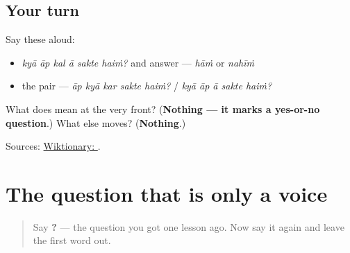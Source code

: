 \subsection*{Your turn}
Say these aloud:

\begin{itemize}
\raggedright
  \item \emph{kyā āp kal ā sakte haiṁ?} and answer — \emph{hāṁ} or \emph{nahīṁ}
  \item the pair — \emph{āp kyā kar sakte haiṁ?} / \emph{kyā āp ā sakte haiṁ?}
\end{itemize}

\begin{tcolorbox}[breakable,colback=teal!4,colframe=teal!35!black,title={Before you move on}]
What does \textbf{} mean at the very front? (\textbf{Nothing — it marks a yes-or-no question}.) What else moves? (\textbf{Nothing}.)

Sources: \href{https://en.wiktionary.org/wiki/\%E0\%A4\%95\%E0\%A5\%8D\%E0\%A4\%AF\%E0\%A4\%BE}{Wiktionary: }.
\end{tcolorbox}
\section[\texorpdfstring{\hi{आप} \hi{आ} \hi{सकते} \hi{हैं}? (āp ā sakte haiṁ?)}{आप आ सकते हैं? (āp ā sakte haiṁ?)}]{The question that is only a voice}

\label{lesson:HI-C74-question-rise}



\begin{quote}
Say \textbf{    ?} — the question you got one lesson ago. Now say it again and leave the first word out.
\end{quote}

